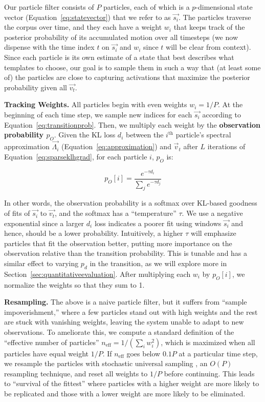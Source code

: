 \documentclass{article}
\begin{document}
Our particle filter consists of $P$ particles, each of which is a $p$-dimensional state vector (Equation~\ref{eq:statevector}) that we refer to as $\vec{s_i}$.  The particles traverse the corpus over time, and they each have a weight $w_i$ that keeps track of the posterior probability of its accumulated motion over all timesteps (we now dispense with the time index $t$ on $\vec{s_i}$ and $w_i$ since $t$ will be clear from context).  Since each particle is its own estimate of a state that best describes what templates to choose, our goal is to sample them in such a way that (at least some of) the particles are close to capturing activations that maximize the posterior probability given all $\vec{v_t}$.

\textbf{Tracking Weights.} All particles begin with even weights $w_i = 1/P$.  At the beginning of each time step, we sample new indices for each $\vec{s_i}$ according to Equation~\ref{eq:transitionprob}.  Then, we multiply each weight by the \textbf{observation probability $p_O$}.  Given the KL loss $d_i$ between the $i^{\text{th}}$ particle's spectral approximation $\vec{\Lambda_i}$ (Equation~\ref{eq:approximation}) and $\vec{v}_t$ after $L$ iterations of Equation~\ref{eq:sparseklhgrad}, for each particle $i$, $p_O$ is:

\begin{equation}
    \label{eq:observationprob}
    p_O[i] = \frac{e^{-\tau d_i}}{ \sum_{j} e^{-\tau d_j}}
\end{equation}

In other words, the observation probability is a softmax over KL-based goodness of fits of $\vec{s_i}$ to $\vec{v_t}$, and the softmax has a ``temperature'' $\tau$.  We use a negative exponential since a larger $d_i$ loss indicates a poorer fit using windows $\vec{s_i}$ and hence, should be a lower probability.  Intuitively, a higher $\tau$ will emphasize particles that fit the observation better, putting more importance on the observation relative than the transition probability.  This is tunable and has a similar effect to varying $p_d$ in the transition, as we will explore more in Section~\ref{sec:quantitativeevaluation}.  After multiplying each $w_i$ by $p_O[i]$, we normalize the weights so that they sum to 1.  

\textbf{Resampling.} The above is a naive particle filter, but it suffers from ``sample impoverishment,'' where a few particles stand out with high weights and the rest are stuck with vanishing weights, leaving the system unable to adapt to new observations.  To ameliorate this, we compute a standard definition of the ``effective number of particles'' $n_{\text{eff}} = 1/(\sum_{i} w_i^2)$, which is maximized when all particles have equal weight $1/P$.  If $n_{\text{eff}}$ goes below $0.1P$ at a particular time step, we resample the particles with stochastic universal sampling \cite{kitagawa1996monte, carpenter1999improved}, an $O(P)$ resampling technique, and reset all weights to $1/P$ before continuing.  This leads to ``survival of the fittest'' where particles with a higher weight are more likely to be replicated and those with a lower weight are more likely to be eliminated.
\end{document}
